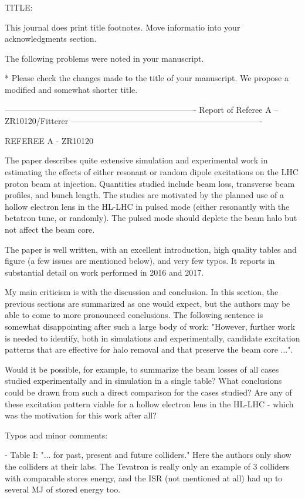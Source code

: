 \documentclass[aps
,prstab
,preprint,tightenlines
,amsfonts,amssymb,amsmath
]{revtex4-1}
\begin{document}
TITLE:

This journal does print title footnotes.  Move informatio into your
acknowledgments section.

The following problems were noted in your manuscript.

* Please check the changes made to the title of your manuscript.
  We propose a modified and somewhat shorter title.

----------------------------------------------------------------------
Report of Referee A -- ZR10120/Fitterer
----------------------------------------------------------------------

REFEREE A - ZR10120 

The paper describes quite extensive simulation and experimental work 
in estimating the effects of either resonant or random dipole 
excitations on the LHC proton beam at injection. Quantities studied 
include beam loss, transverse beam profiles, and bunch length. The 
studies are motivated by the planned use of a hollow electron lens in 
the HL-LHC in pulsed mode (either resonantly with the betatron tune, 
or randomly). The pulsed mode should deplete the beam halo but not 
affect the beam core. 

The paper is well written, with an excellent introduction, high 
quality tables and figure (a few issues are mentioned below), and very 
few typos. It reports in substantial detail on work performed in 2016 
and 2017. 

My main criticism is with the discussion and conclusion. In this 
section, the previous sections are summarized as one would expect, but 
the authors may be able to come to more pronounced conclusions. The 
following sentence is somewhat disappointing after such a large body 
of work: "However, further work is needed to identify, both in 
simulations and experimentally, candidate excitation patterns that are 
effective for halo removal and that preserve the beam core ...". 

Would it be possible, for example, to summarize the beam losses of all 
cases studied experimentally and in simulation in a single table? What 
conclusions could be drawn from such a direct comparison for the cases 
studied? Are any of these excitation pattern viable for a hollow 
electron lens in the HL-LHC - which was the motivation for this work 
after all? 

Typos and minor comments: 

- Table I: "... for past, present and future colliders." Here the 
authors only show the colliders at their labs. The Tevatron is really 
only an example of 3 colliders with comparable stores energy, and the 
ISR (not mentioned at all) had up to several MJ of stored energy too. 
\end{document}
